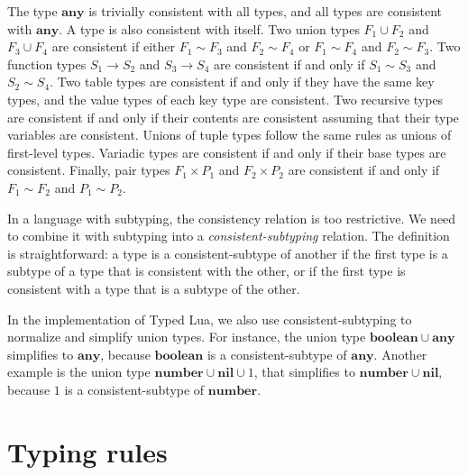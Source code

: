 \documentclass[preprint]{sigplanconf}
\newcommand{\Any}{\mathbf{any}}
\newcommand{\Nil}{\mathbf{nil}}
\newcommand{\Boolean}{\mathbf{boolean}}
\newcommand{\Number}{\mathbf{number}}
\begin{document}
The type $\Any$ is trivially consistent with all types, and all types
are consistent with $\Any$. A type is also consistent with
itself. Two union types $F_1 \cup F_2$ and $F_3 \cup F_4$ are
consistent if either $F_1 \sim F_3$ and $F_2 \sim F_4$ or
$F_1 \sim F_4$ and $F_2 \sim F_3$. Two function types
$S_1 \rightarrow S_2$ and $S_3 \rightarrow S_4$ are consistent
if and only if $S_1 \sim S_3$ and $S_2 \sim S_4$. Two table types are consistent if and only if they have the same key types, and the value types of each key type are consistent. Two recursive types are consistent if and only if their contents are consistent assuming that their type variables are consistent. Unions of tuple types follow the same rules as unions of first-level types. Variadic types are consistent if and only if their base types are consistent. 
Finally, pair types $F_1 \times P_1$ and $F_2 \times P_2$ are
consistent if and only if $F_1 \sim F_2$ and $P_1 \sim P_2$.

In a language with subtyping, the consistency relation is
too restrictive. We need to combine it with subtyping into a
{\em consistent-subtyping} relation. The definition is
straightforward: a type is a consistent-subtype
of another if the first type is a subtype of a type
that is consistent with the other, or if the first type
is consistent with a type that is a subtype of the other.

In the implementation of Typed Lua, we also use consistent-subtyping to normalize and simplify union types.
For instance, the union type $\Boolean \cup \Any$ simplifies
to $\Any$, because $\Boolean$ is a consistent-subtype
of $\Any$. Another example is the union type
$\Number \cup \Nil \cup 1$, that simplifies to
$\Number \cup \Nil$, because $1$ is a consistent-subtype of $\Number$.

\section{Typing rules}
\label{sec:rules}
\end{document}
